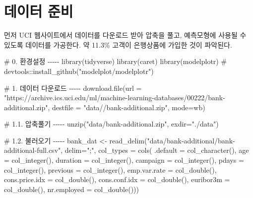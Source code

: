 \documentclass[
  letterpaper,
  chapter,a4paper,showtrims,openright,hidelinks]{oblivoir}
\newenvironment{Shaded}{\begin{snugshade}}{\end{snugshade}}
\newcommand{\AttributeTok}[1]{\textcolor[rgb]{0.40,0.45,0.13}{#1}}
\newcommand{\CommentTok}[1]{\textcolor[rgb]{0.37,0.37,0.37}{#1}}
\newcommand{\FunctionTok}[1]{\textcolor[rgb]{0.28,0.35,0.67}{#1}}
\newcommand{\NormalTok}[1]{\textcolor[rgb]{0.00,0.23,0.31}{#1}}
\newcommand{\OtherTok}[1]{\textcolor[rgb]{0.00,0.23,0.31}{#1}}
\newcommand{\StringTok}[1]{\textcolor[rgb]{0.13,0.47,0.30}{#1}}
\begin{document}
\hypertarget{predictive-model-x}{%
\section{데이터 준비}\label{predictive-model-x}}

먼저 UCI 웹사이트에서 데이터를 다운로드 받아 압축을 풀고, 예측모형에
사용될 수 있도록 데이터를 가공한다. 약 11.3\% 고객이 은행상품에 가입한
것이 파악된다.

\begin{Shaded}
\begin{Highlighting}[]
\CommentTok{\# 0. 환경설정 {-}{-}{-}{-}{-}}
\FunctionTok{library}\NormalTok{(tidyverse)}
\FunctionTok{library}\NormalTok{(caret)}
\FunctionTok{library}\NormalTok{(modelplotr) }\CommentTok{\# devtools::install\_github("modelplot/modelplotr")}

\CommentTok{\# 1. 데이터 다운로드 {-}{-}{-}{-}{-}}
\FunctionTok{download.file}\NormalTok{(}\AttributeTok{url =} \StringTok{"https://archive.ics.uci.edu/ml/machine{-}learning{-}databases/00222/bank{-}additional.zip"}\NormalTok{, }\AttributeTok{destfile =} \StringTok{"data//bank{-}additional.zip"}\NormalTok{, }\AttributeTok{mode=}\StringTok{\textquotesingle{}wb\textquotesingle{}}\NormalTok{)}

\CommentTok{\# 1.1. 압축풀기 {-}{-}{-}{-}{-}}
\FunctionTok{unzip}\NormalTok{(}\StringTok{"data/bank{-}additional.zip"}\NormalTok{, }\AttributeTok{exdir=}\StringTok{"./data"}\NormalTok{)}

\CommentTok{\# 1.2. 불러오기 {-}{-}{-}{-}{-}}
\NormalTok{bank\_dat }\OtherTok{\textless{}{-}} \FunctionTok{read\_delim}\NormalTok{(}\StringTok{"data/bank{-}additional/bank{-}additional{-}full.csv"}\NormalTok{, }\AttributeTok{delim=}\StringTok{";"}\NormalTok{,}
                      \AttributeTok{col\_types =} \FunctionTok{cols}\NormalTok{(}
                              \AttributeTok{.default =} \FunctionTok{col\_character}\NormalTok{(),}
                              \AttributeTok{age =} \FunctionTok{col\_integer}\NormalTok{(),}
                              \AttributeTok{duration =} \FunctionTok{col\_integer}\NormalTok{(),}
                              \AttributeTok{campaign =} \FunctionTok{col\_integer}\NormalTok{(),}
                              \AttributeTok{pdays =} \FunctionTok{col\_integer}\NormalTok{(),}
                              \AttributeTok{previous =} \FunctionTok{col\_integer}\NormalTok{(),}
                              \AttributeTok{emp.var.rate =} \FunctionTok{col\_double}\NormalTok{(),}
                              \AttributeTok{cons.price.idx =} \FunctionTok{col\_double}\NormalTok{(),}
                              \AttributeTok{cons.conf.idx =} \FunctionTok{col\_double}\NormalTok{(),}
                              \AttributeTok{euribor3m =} \FunctionTok{col\_double}\NormalTok{(),}
                              \AttributeTok{nr.employed =} \FunctionTok{col\_double}\NormalTok{()))}



\end{Highlighting}
\end{Shaded}
\end{document}
